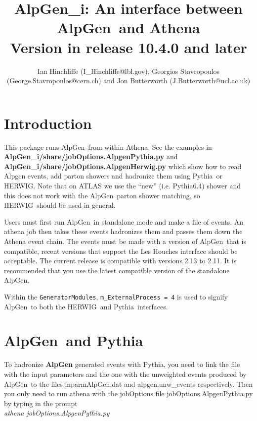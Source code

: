 \documentclass[11pt]{article}
\def\herwig{{HERWIG}}
\def\pythia{{\sc Pythia}}
\def\alpgen{{AlpGen}}
\begin{document}
\title{\alpgen\_i: An interface between \alpgen\ and Athena\\
Version in release 10.4.0 and later}
\author{  Ian Hinchliffe (I\_Hinchliffe@lbl.gov), Georgios Stavropoulos (George.Stavropoulos@cern.ch) and Jon Butterworth (J.Butterworth@ucl.ac.uk)}

\maketitle           

\section{Introduction}

\noindent
This package runs \alpgen\  from within Athena. See the examples in 
\\ {\bf \alpgen\_i/share/jobOptions.AlpgenPythia.py } 
and 
\\ {\bf \alpgen\_i/share/jobOptions.AlpgenHerwig.py }  
which show how to read Alpgen events, add parton showers and
hadronize them using \pythia\ or \herwig. Note that on ATLAS we use the
``new'' (i.e. \pythia 6.4) shower and this does not work with the \alpgen\
parton shower matching, so \herwig\ should be used in general.

\bigskip

\noindent
Users must first run \alpgen\ in standalone mode and make a file of
events. An athena job then takes these events hadronizes them and
passes them down the Athena event chain. The events must be made with
a version of \alpgen\ that is compatible, recent versions that support
the Les Houches interface should be acceptable. The current release is
compatible with versions 2.13 to 2.11. It is recommended that you use
the latest compatible version of the standalone \alpgen.

Within the {\tt GeneratorModules}, {\tt m\_ExternalProcess = 4} is used to
signify \alpgen\ to both the \herwig\ and \pythia\ interfaces.

\bigskip

\section{\alpgen\ and \pythia}

\noindent
To hadronize {\bf \alpgen} generated events with \pythia, you need to link the file with the input parameters 
and the one with the unweighted events produced by \alpgen\ to the files inparmAlpGen.dat and alpgen.unw\_events 
respectively. Then you only need to run athena with the jobOptions file jobOptions.AlpgenPythia.py by typing 
in the prompt \\ {\it athena jobOptions.AlpgenPythia.py}
\end{document}
